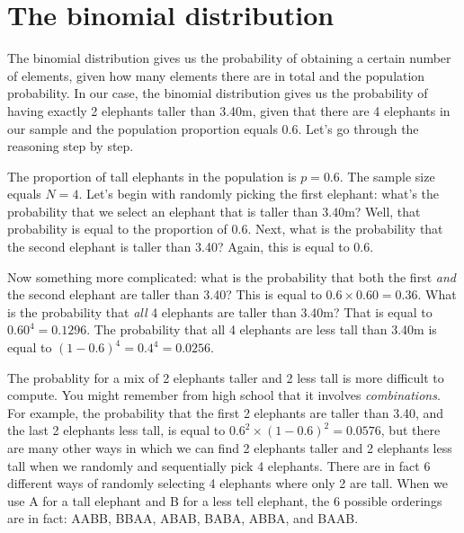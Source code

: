 \section{The binomial distribution}

The binomial distribution gives us the probability of obtaining a certain number of elements, given how many elements there are in total and the population probability. In our case, the binomial distribution gives us the probability of having exactly 2 elephants taller than 3.40m, given that there are 4 elephants in our sample and the population proportion equals 0.6. Let's go through the reasoning step by step.

\begin{knitrout}
\color{fgcolor}\begin{kframe}


{\ttfamily\noindent\bfseries{}}\end{kframe}
\end{knitrout}



The proportion of tall elephants in the population is $p = 0.6$. The sample size equals $N = 4$. Let's begin with randomly picking the first elephant: what's the probability that we select an elephant that is taller than 3.40m? Well, that probability is equal to the proportion of 0.6. Next, what is the probability that the second elephant is taller than 3.40? Again, this is equal to 0.6. 

Now something more complicated: what is the probability that both the first \textit{and} the second elephant are taller than 3.40? This is equal to $0.6 \times 0.60 = 0.36$. What is the probability that \textit{all} 4 elephants are taller than 3.40m? That is equal to $0.60^4 = 0.1296$. The probability that all 4 elephants are less tall than 3.40m is equal to $(1-0.6)^4 = 0.4^4=0.0256$. 

The probablity for a mix of 2 elephants taller and 2 less tall is more difficult to compute. You might remember from high school that it involves \textit{combinations}. For example, the probability that the first 2 elephants are taller than 3.40, and the last 2 elephants less tall, is equal to $0.6^2 \times (1-0.6)^2 = 0.0576$, but there are many other ways in which we can find 2 elephants taller and 2 elephants less tall when we randomly and sequentially pick 4 elephants. There are in fact 6 different ways of randomly selecting 4 elephants where only 2 are tall. When we use A for a tall elephant and B for a less tell elephant, the 6 possible orderings are in fact: AABB, BBAA, ABAB, BABA, ABBA, and BAAB. 

